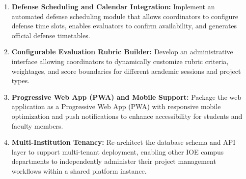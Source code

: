 \begin{enumerate}
  \item \textbf{Defense Scheduling and Calendar Integration:} Implement an automated defense scheduling module that allows coordinators to configure defense time slots, enables evaluators to confirm availability, and generates official defense timetables.
  
  \item \textbf{Configurable Evaluation Rubric Builder:} Develop an administrative interface allowing coordinators to dynamically customize rubric criteria, weightages, and score boundaries for different academic sessions and project types.
  
  \item \textbf{Progressive Web App (PWA) and Mobile Support:} Package the web application as a Progressive Web App (PWA) with responsive mobile optimization and push notifications to enhance accessibility for students and faculty members.
  
  \item \textbf{Multi-Institution Tenancy:} Re-architect the database schema and API layer to support multi-tenant deployment, enabling other IOE campus departments to independently administer their project management workflows within a shared platform instance.
\end{enumerate}
